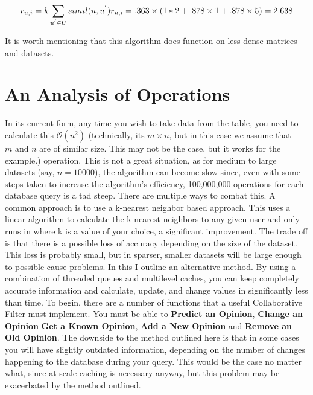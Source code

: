\documentclass[12pt]{article}
\begin{document}
  \begin{displaymath}
    r_{u,i} = k \sum_{u^{'} \in U} simil(u, u^{'}) r_{u, i} = .363 \times (1 * 2 + .878 \times 1 + .878 \times 5) = 2.638
  \end{displaymath}

  \indent It is worth mentioning that this algorithm does function on less dense matrices and datasets.  

  \pagebreak
  \section{An Analysis of Operations}

  \indent\indent In its current form, any time you wish to take data from the table, you need to calculate this $\mathcal{O}(n^2)$ (technically, its $m \times n$, but in this case we assume that $m \text{ and } n$ are of similar size.  This may not be the case, but it works for the example.) operation.  This is not a great situation, as for medium to large datasets (say, $n = 10000$), the algorithm can become slow since, even with some steps taken to increase the algorithm's efficiency, 100,000,000 operations for each database query is a tad steep.  
  \p There are multiple ways to combat this.  A common approach is to use a k-nearest neighbor based approach.  This uses a linear algorithm to calculate the k-nearest neighbors to any given user and only runs in  where k is a value of your choice, a significant improvement.  The trade off is that there is a possible loss of accuracy depending on the size of the dataset.  This loss is probably small, but in sparser, smaller datasets will be large enough to possible cause problems.
  \p In this I outline an alternative method.  By using a combination of threaded queues and multilevel caches, you can keep completely accurate information and calculate, update, and change values in significantly less than  time.  To begin, there are a number of functions that a useful Collaborative Filter must implement.  You must be able to \textbf{Predict an Opinion}, \textbf{Change an Opinion} \textbf{Get a Known Opinion}, \textbf{Add a New Opinion} and \textbf{Remove an Old Opinion}.  
  \p The downside to the method outlined here is that in some cases you will have slightly outdated information, depending on the number of changes happening to the database during your query.  This would be the case no matter what, since at scale caching is necessary anyway, but this problem may be exacerbated by the method outlined.
\end{document}
